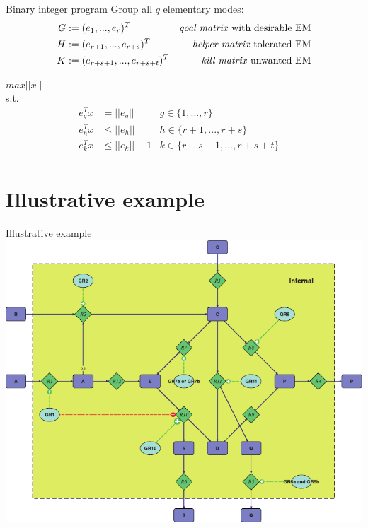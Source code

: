 \documentclass{beamer}
\begin{document}
\begin{frame}{Binary integer program}
    Group all $q$ elementary modes:
    \begin{align*}
        G &:= (e_{1}, ..., e_{r})^{T}            &\text{\emph{goal matrix} with desirable EM}   &\\
        H &:= (e_{r+1}, ..., e_{r+s})^{T}        &\text{\emph{helper matrix} tolerated EM}      &\\
        K &:= (e_{r+s+1}, ..., e_{r+s+t})^{T}    &\text{\emph{kill matrix} unwanted EM}         &\\
    \end{align*}
    
$max ||x||$ \\
s.t. 
\begin{align*}
    e^{T}_{g} x & =       ||e_{g}||      & g \in \{1, ..., r\}     &~\\
    e^{T}_{h} x & \leq    ||e_{h}||     & h \in \{r+1, ..., r+s\} &~\\
    e^{T}_{k} x & \leq    ||e_{k}||-1  & k \in \{r+s+1, ..., r+s+t\} &~\\
\end{align*}

 
    
\end{frame}

\section{Illustrative example}
\begin{frame}{Illustrative example}
    \includegraphics[width=.9\textwidth]{grafik/fig1} \\
\end{frame}
\end{document}
